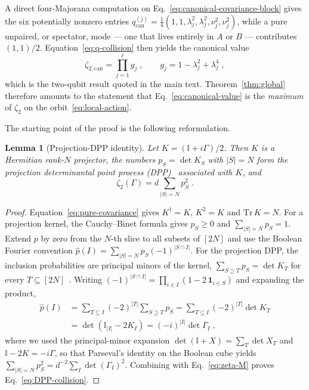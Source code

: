 \documentclass[prx,twocolumn,superscriptaddress,aps,10pt, frontmatterverbose, reprint,footinbib,longbibliography=true]{revtex4-2}
\newtheorem{lemma}{Lemma}
\begin{document}
A direct four-Majorana computation on Eq.~\eqref{eq:canonical-covariance-block} gives the six potentially nonzero entries $q^{(j)}_{\mathrm{can}}=\tfrac14(1,1,\lambda_j^2,\lambda_j^2,\nu_j^2,\nu_j^2)$, while a pure unpaired, or spectator, mode --- one that lives entirely in $A$ or $B$ --- contributes $(1,1)/2$. Equation~\eqref{eq:q-collision} then yields the canonical value
\begin{equation}
    \zeta_{2,\mathrm{can}}=\prod_{j=1}^{\ell}g_j\;,\qquad g_j=1-\lambda_j^2+\lambda_j^4\;,
    \label{eq:canonical-value}
\end{equation}
which is the two-qubit result quoted in the main text. Theorem~\ref{thm:global} therefore amounts to the statement that Eq.~\eqref{eq:canonical-value} is the \emph{maximum} of $\zeta_2$ on the orbit~\eqref{eq:local-action}.

The starting point of the proof is the following reformulation.

\begin{lemma}[Projection-DPP identity]
\label{lem:DPP}
Let $K=(\mathbb{I}+i\Gamma)/2$. Then $K$ is a Hermitian rank-$N$ projector, the numbers $p_S=\det K_S$ with $|S|=N$ form the projection determinantal point process (DPP)~\cite{collura2026nonstabilizernessfermionicgaussianstates} associated with $K$, and
\begin{equation}
    \zeta_2(\Gamma)=d\sum_{|S|=N}p_S^2\;.
    \label{eq:DPP-collision}
\end{equation}
\end{lemma}

\begin{proof}
Equation~\eqref{eq:pure-covariance} gives $K^\dagger=K$, $K^2=K$ and $\mathrm{Tr}\,K=N$. For a projection kernel, the Cauchy--Binet formula gives $p_S\ge0$ and $\sum_{|S|=N}p_S=1$. Extend $p$ by zero from the $N$-th slice to all subsets of $[2N]$ and use the Boolean Fourier convention $\widehat p(I)=\sum_{|S|=N}p_S(-1)^{|S\cap I|}$. For the projection DPP, the inclusion probabilities are principal minors of the kernel, $\sum_{S\supseteq T}p_S=\det K_T$ for every $T\subseteq[2N]$~\cite{Hough2006}. Writing $(-1)^{|S\cap I|}=\prod_{i\in I}(1-2\,\mathbf{1}_{i\in S})$ and expanding the product,
\begin{equation}
\begin{split}
    \widehat p(I)&=\sum_{T\subseteq I}(-2)^{|T|}\!\!\sum_{S\supseteq T}p_S=\sum_{T\subseteq I}(-2)^{|T|}\det K_T\\
    &=\det(\mathbb{I}_{|I|}-2K_I)=(-i)^{|I|}\det\Gamma_I\;,
\end{split}
\end{equation}
where we used the principal-minor expansion $\det(\mathbb{I}+X)=\sum_{T}\det X_{T}$ and $\mathbb{I}-2K=-i\Gamma$,
so that Parseval's identity on the Boolean cube yields $\sum_{|S|=N}p_S^2=d^{-2}\sum_I\det(\Gamma_I)^2$. Combining with Eq.~\eqref{eq:zeta-M} proves Eq.~\eqref{eq:DPP-collision}.
\end{proof}
\end{document}
